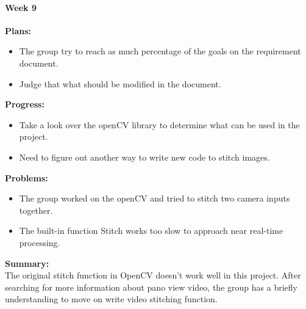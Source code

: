 \paragraph{Week 9}
\begin{adjustwidth}{2.5em}{0pt}
    \vspace{-0.5cm}\textbf{Plans:}
    \vspace{-0.5cm}
    \begin{itemize}
        \item The group try to reach as much percentage of the goals on the requirement document.
        \item Judge that what should be modified in the document.
    \end{itemize} 
    \vspace{-0.3cm}\textbf{Progress:}
    \vspace{-0.5cm}
    \begin{itemize}
        \item Take a look over the openCV library to determine what can be used in the project. 
        \item Need to figure out another way to write new code to stitch images.
    \end{itemize} 
    \vspace{-0.3cm}\textbf{Problems:}
    \vspace{-0.5cm}
    \begin{itemize}
        \item The group worked on the openCV and tried to stitch two camera inputs together. 
        \item The built-in function Stitch works too slow to approach near real-time processing.
    \end{itemize}  
    \vspace{-0.3cm}\noindent\textbf{Summary:}\\
    \noindent The original stitch function in OpenCV doesn't work well in this project. After searching for 
    more information about pano view video, the group has a briefly understanding to move on write video 
    stitching function. \\
\end{adjustwidth} 

